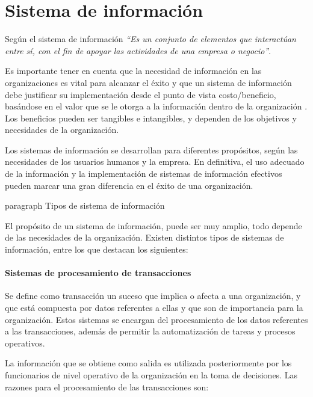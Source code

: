 \section{Sistema de información }

Según\cite{kendall2005analisis} el sistema de información\textit{ “Es un conjunto de elementos que interactúan entre sí, con el fin de apoyar las actividades de una empresa o negocio”}.

Es importante tener en cuenta que la necesidad de información en las organizaciones es vital para alcanzar el éxito y que un sistema de información debe justificar su implementación desde el punto de vista costo/beneficio, basándose en el valor que se le otorga a la información dentro de la organización \cite{kendall2005analisis}. Los beneficios pueden ser tangibles e intangibles, y dependen de los objetivos y necesidades de la organización.

Los sistemas de información se desarrollan para diferentes propósitos, según las necesidades de los usuarios humanos y la empresa. En definitiva, el uso adecuado de la información y la implementación de sistemas de información efectivos pueden marcar una gran diferencia en el éxito de una organización.

paragraph{ Tipos de sistema de información}

El propósito de un sistema de información, puede ser muy amplio, todo depende de las necesidades de la organización. Existen distintos tipos de sistemas de información, entre los que destacan los siguientes\cite{kendall2005analisis}:

\setcounter{secnumdepth}{3}
\paragraph{Sistemas de procesamiento de transacciones}

Se define como transacción un suceso que implica o afecta a una organización, y que está compuesta por datos referentes a ellas y que son de importancia para la organización\cite{kendall2005analisis}. Estos sistemas se encargan del procesamiento de los datos referentes a las transacciones, además de permitir la automatización de tareas y procesos operativos. 

La información que se obtiene como salida es utilizada posteriormente por los funcionarios de nivel operativo de la organización en la toma de decisiones. Las razones para el procesamiento de las transacciones son:  

